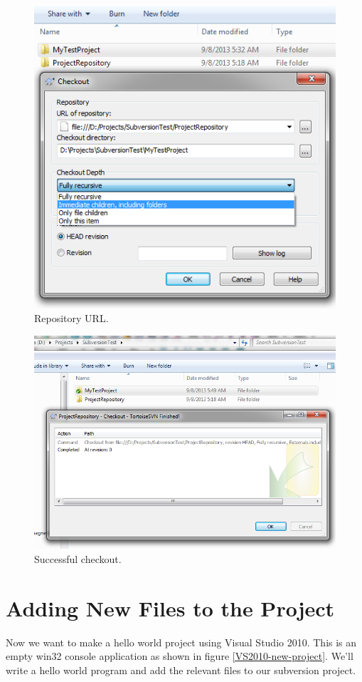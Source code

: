 \documentclass[12pt,a4paper]{article}
\begin{document}
\begin{figure}[H]
\centering
\includegraphics[scale=0.75]{CheckoutandRepositoryURL.png}
\caption{Repository URL.}
\label{Checkout-URL}
\end{figure}
\begin{figure}[H]
\centering
\includegraphics[scale=0.75]{CheckoutFinished.png}
\caption{Successful checkout.}
\label{Checkout-finished}
\end{figure}
\section{Adding New Files to the Project}
Now we want to make a hello world project using Visual Studio 2010. This is an empty win32 console application as shown in figure \ref{VS2010-new-project}. We'll write a hello world program and add the relevant files to our subversion project.
\end{document}
